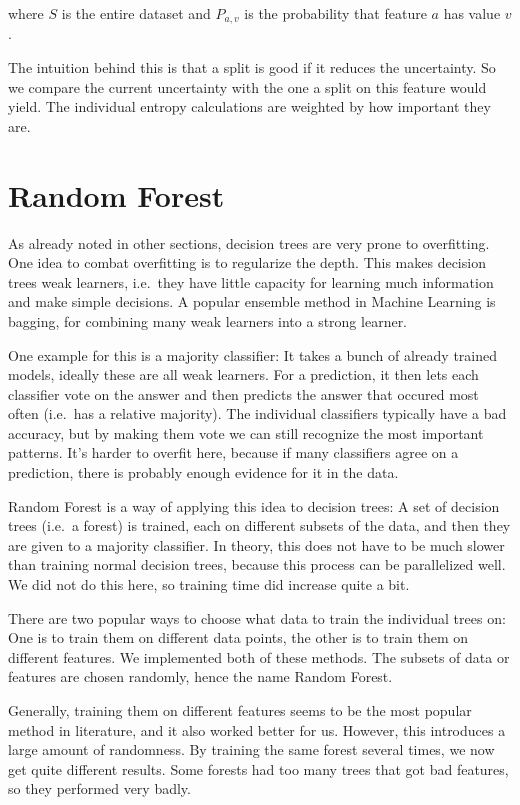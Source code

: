 \documentclass[a4paper]{article}
\begin{document}
\noindent where $S$ is the entire dataset and $P_{a, v}$ is the probability that feature $a$ has value $v$.

The intuition behind this is that a split is good if it reduces the uncertainty. So we compare the current uncertainty with the one a split on this feature would yield. The individual entropy calculations are weighted by how important they are.

\section{Random Forest}

As already noted in other sections, decision trees are very prone to overfitting. One idea to combat overfitting is to regularize the depth. This makes decision trees weak learners, i.e.\ they have little capacity for learning much information and make simple decisions. A popular ensemble method in Machine Learning is bagging, for combining many weak learners into a strong learner.

One example for this is a majority classifier: It takes a bunch of already trained models, ideally these are all weak learners. For a prediction, it then lets each classifier vote on the answer and then predicts the answer that occured most often (i.e.\ has a relative majority). The individual classifiers typically have a bad accuracy, but by making them vote we can still recognize the most important patterns. It's harder to overfit here, because if many classifiers agree on a prediction, there is probably enough evidence for it in the data.

Random Forest is a way of applying this idea to decision trees: A set of decision trees (i.e.\ a forest) is trained, each on different subsets of the data, and then they are given to a majority classifier. In theory, this does not have to be much slower than training normal decision trees, because this process can be parallelized well. We did not do this here, so training time did increase quite a bit.

There are two popular ways to choose what data to train the individual trees on: One is to train them on different data points, the other is to train them on different features. We implemented both of these methods. The subsets of data or features are chosen randomly, hence the name Random Forest.

Generally, training them on different features seems to be the most popular method in literature, and it also worked better for us. However, this introduces a large amount of randomness. By training the same forest several times, we now get quite different results. Some forests had too many trees that got bad features, so they performed very badly.
\end{document}
